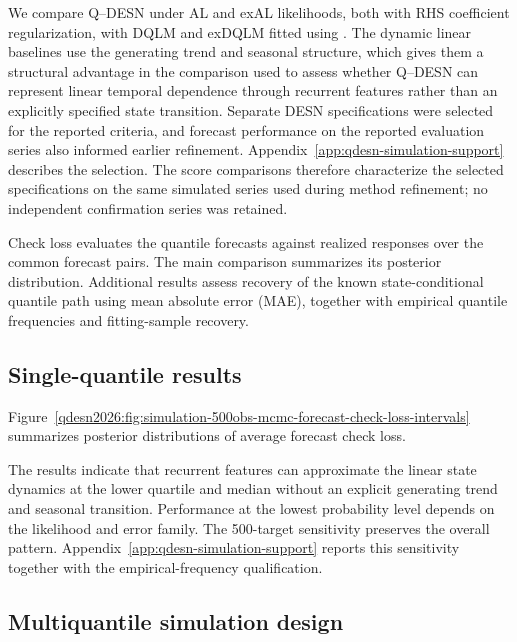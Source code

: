We compare Q--DESN under AL and exAL likelihoods, both with RHS coefficient
regularization, with DQLM and exDQLM fitted using 
\citep{env-deleon2026exdqlm}. The dynamic linear baselines use the generating
trend and seasonal structure, which gives them a structural advantage in the
comparison used to assess whether Q--DESN can represent linear temporal
dependence
through recurrent features rather than an explicitly specified state
transition. Separate DESN specifications were selected for the reported
criteria, and forecast performance on the reported evaluation series also
informed earlier refinement. Appendix~\ref{app:qdesn-simulation-support}
describes the selection. The score comparisons therefore characterize the
selected specifications on the same simulated series used during method
refinement; no independent confirmation series was retained.

Check loss evaluates the quantile forecasts against realized responses over
the common forecast pairs. The main comparison summarizes its posterior
distribution. Additional results assess recovery of the known
state-conditional quantile path using mean absolute error (MAE), together
with empirical quantile frequencies and fitting-sample recovery.

\subsection{Single-quantile results}

Figure~\ref{qdesn2026:fig:simulation-500obs-mcmc-forecast-check-loss-intervals}
summarizes posterior distributions of average forecast check loss.



The results indicate that recurrent features can approximate
the linear state dynamics at the lower quartile and median without an
explicit generating trend and seasonal transition. Performance at the lowest
probability level depends on the likelihood and error family.
The 500-target sensitivity preserves the overall pattern.
Appendix~\ref{app:qdesn-simulation-support} reports this sensitivity together with
the empirical-frequency qualification.



\subsection{Multiquantile simulation design}

